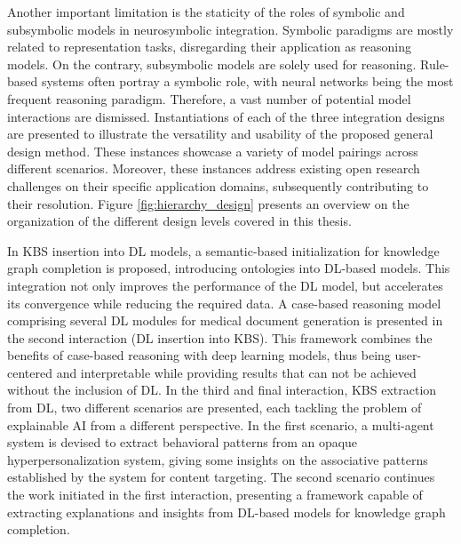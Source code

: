 Another important limitation is the staticity of the roles of symbolic and subsymbolic models in neurosymbolic integration. Symbolic paradigms are mostly related to representation tasks, disregarding their application as reasoning models. On the contrary, subsymbolic models are solely used for reasoning. Rule-based systems often portray a symbolic role, with neural networks being the most frequent reasoning paradigm. Therefore, a vast number of potential model interactions are dismissed. Instantiations of each of the three integration designs are presented to illustrate the versatility and usability of the proposed general design method. These instances showcase a variety of model pairings across different scenarios. Moreover, these instances address existing open research challenges on their specific application domains, subsequently contributing to their resolution. Figure \ref{fig:hierarchy_design} presents an overview on the organization of the different design levels covered in this thesis. 

In KBS insertion into DL models, a semantic-based initialization for knowledge graph completion is proposed, introducing ontologies into DL-based models. This integration not only improves the performance of the DL model, but accelerates its convergence while reducing the required data. A case-based reasoning model comprising several DL modules for medical document generation is presented in the second interaction (DL insertion into KBS). This framework combines the benefits of case-based reasoning with deep learning models, thus being user-centered and interpretable while providing results that can not be achieved without the inclusion of DL. In the third and final interaction, KBS extraction from DL, two different scenarios are presented, each tackling the problem of explainable AI from a different perspective. In the first scenario, a multi-agent system is devised to extract behavioral patterns from an opaque hyperpersonalization system, giving some insights on the associative patterns established by the system for content targeting. The second scenario continues the work initiated in the first interaction, presenting a framework capable of extracting explanations and insights from DL-based models for knowledge graph completion. 

